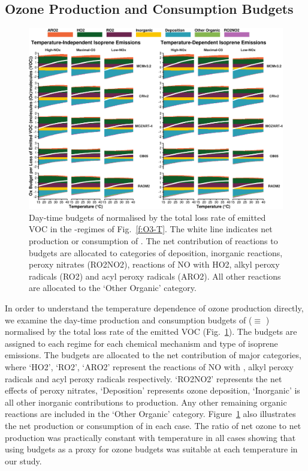 \subsection{Ozone Production and Consumption Budgets} \label{ss:r_budgets}
\begin{figure}[t]%
    \centering%
    \caption{Day-time budgets of  normalised by the total loss rate of emitted VOC in the -regimes of Fig.~\ref{f:O3-T}. The white line indicates net production or consumption of . The net contribution of reactions to  budgets are allocated to categories of deposition, inorganic reactions, peroxy nitrates (RO2NO2), reactions of NO with HO2, alkyl peroxy radicals (RO2) and acyl peroxy radicals (ARO2). All other reactions are allocated to the `Other Organic' category.}%
    \label{f:ozone_budgets}%
    \includegraphics[width = \textwidth]{img/Ox_budgets}%
    \vspace{-4mm}
\end{figure}
% 
In order to understand the temperature dependence of ozone production directly, we examine the day-time production and consumption budgets of  ($\equiv$ ) normalised by the total loss rate of the emitted VOC (Fig.~\ref{f:ozone_budgets}).
The  budgets are assigned to each  regime for each chemical mechanism and type of isoprene emissions.
The budgets are allocated to the net contribution of major categories, where `HO2', `RO2', `ARO2' represent the reactions of NO with , alkyl peroxy radicals and acyl peroxy radicals respectively.
`RO2NO2' represents the net effects of peroxy nitrates, `Deposition' represents ozone deposition, `Inorganic' is all other inorganic contributions to  production.
Any other remaining organic reactions are included in the `Other Organic' category.
Figure~\ref{f:ozone_budgets} also illustrates the net production or consumption of  in each case.
The ratio of net ozone to net  production was practically constant with temperature in all cases showing that using  budgets as a proxy for ozone budgets was suitable at each temperature in our study.

